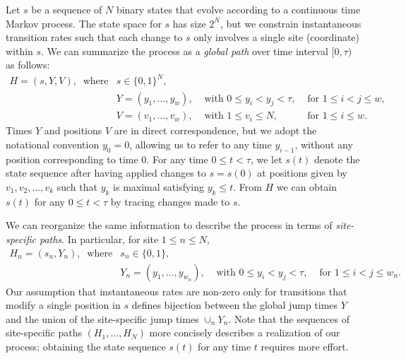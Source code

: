 \documentclass[11pt]{article}
\newcommand\halfopen[2]{\ensuremath{[#1,#2)}}
\begin{document}
Let $s$ be a sequence of $N$ binary states that evolve according to a
continuous time Markov process. The state space for $s$ has size
$2^N$, but we constrain instantaneous transition rates such that each
change to $s$ only involves a single site (coordinate) within $s$. We
can summarize the process as a {\it global path} over time interval
$\halfopen{0}{\tau}$ as follows:
\begin{equation}\label{globalJumps}
\begin{array}{llll}
H = (s, Y, V), ~\mbox{ where} & s \in \{0,1\}^N,\\
                              & Y = (y_1, \ldots, y_w), & \mbox{ with } 0 \leq y_i < y_{j} < \tau, & \mbox{ for } 1\leq i < j \leq w,\\
                              & V = (v_1,\ldots, v_w), & \mbox{ with } 1\leq v_i\leq N, & \mbox{ for } 1\leq i \leq w.
\end{array}
\end{equation}
Times $Y$ and positions $V$ are in direct correspondence, but we adopt
the notational convention $y_0 = 0$, allowing us to refer to any time
$y_{i-1}$, without any position corresponding to time $0$.
For any time $0 \leq t < \tau$, we let $s(t)$ denote the state
sequence after having applied changes to $s = s(0)$ at positions given
by $v_1,v_2,\ldots,v_k$ such that $y_k$ is maximal satisfying $y_k
\leq t$. From $H$ we can obtain $s(t)$ for any $0\leq t < \tau$ by
tracing changes made to $s$.

We can reorganize the same information to describe the process in
terms of {\it site-specific paths}. In particular, for site $1\leq n
\leq N$,
\begin{equation}\label{localJumps}
\begin{array}{llll}
H_n = (s_n, Y_n), ~\mbox{ where} & s_n \in \{0,1\},\\
                                & Y_n = (y_1, \ldots, y_{w_n}), & \mbox{ with } 0\leq y_i < y_{j} < \tau, & \mbox{ for } 1\leq i < j \leq w_n.
\end{array}
\end{equation}
Our assumption that instantaneous rates are non-zero only for
transitions that modify a single position in $s$ defines bijection
between the global jump times $Y$ and the union of the site-specific
jump times $\cup_n Y_n$. Note that the sequences of site-specific
paths $(H_1,\ldots,H_N)$ more concisely describes a realization of our
process;
obtaining the state sequence $s(t)$ for any time $t$ requires
more effort.
\end{document}

